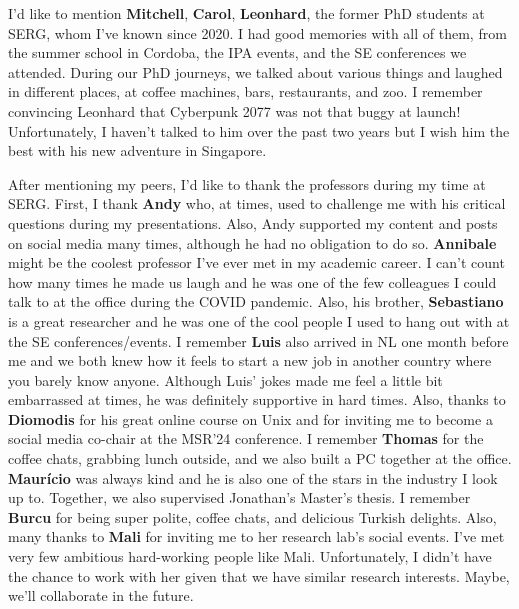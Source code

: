 I'd like to mention \textbf{Mitchell}, \textbf{Carol}, \textbf{Leonhard}, the former PhD students at SERG, whom I've known since 2020. I had good memories with all of them, from the summer school in Cordoba, the IPA events, and the SE conferences we attended. During our PhD journeys, we talked about various things and laughed in different places, at coffee machines, bars, restaurants, and zoo. I remember convincing Leonhard that Cyberpunk 2077 was not that buggy at launch! Unfortunately, I haven't talked to him over the past two years but I wish him the best with his new adventure in Singapore. 

After mentioning my peers, I'd like to thank the professors during my time at SERG. First, I thank \textbf{Andy} who, at times, used to challenge me with his critical questions during my presentations. Also, Andy supported my content and posts on social media many times, although he had no obligation to do so. \textbf{Annibale} might be the coolest professor I've ever met in my academic career. I can't count how many times he made us laugh and he was one of the few colleagues I could talk to at the office during the COVID pandemic. Also, his brother, \textbf{Sebastiano} is a great researcher and he was one of the cool people I used to hang out with at the SE conferences/events.  I remember \textbf{Luis} also arrived in NL one month before me and we both knew how it feels to start a new job in another country where you barely know anyone. Although Luis' jokes made me feel a little bit embarrassed at times, he was definitely supportive in hard times. Also, thanks to \textbf{Diomodis} for his great online course on Unix and for inviting me to become a social media co-chair at the MSR'24 conference. I remember \textbf{Thomas} for the coffee chats, grabbing lunch outside, and we also built a PC together at the office. \textbf{Maurício} was always kind and he is also one of the stars in the industry I look up to. Together, we also supervised Jonathan's Master's thesis. I remember \textbf{Burcu} for being super polite, coffee chats, and delicious Turkish delights. Also, many thanks to \textbf{Mali} for inviting me to her research lab's social events. I’ve met very few ambitious hard-working people like Mali. Unfortunately, I didn't have the chance to work with her given that we have similar research interests. Maybe, we'll collaborate in the future.

